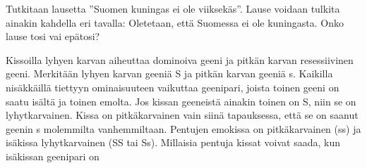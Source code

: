 \begin{kotitehtavasivu}
\begin{tehtava}
\end{tehtava}

\begin{tehtava}
    Tutkitaan lausetta ''Suomen kuningas ei ole viiksekäs''. Lause voidaan tulkita ainakin kahdella eri tavalla:
    Oletetaan, että Suomessa ei ole kuningasta. Onko lause tosi vai epätosi?

    \begin{vastaus}
    \end{vastaus}
    
\end{tehtava}

\begin{tehtava}
    Kissoilla lyhyen karvan aiheuttaa dominoiva geeni ja pitkän karvan resessiivinen geeni. Merkitään lyhyen karvan geeniä S ja pitkän karvan geeniä s. Kaikilla nisäkkäillä tiettyyn ominaisuuteen vaikuttaa geenipari, joista toinen geeni on saatu isältä ja toinen emolta. Jos kissan geeneistä ainakin toinen on S, niin se on lyhytkarvainen. Kissa on pitkäkarvainen vain siinä tapauksessa, että se on saanut geenin s molemmilta vanhemmiltaan.  Pentujen emokissa on pitkäkarvainen (ss) ja isäkissa lyhytkarvainen (SS tai Ss). Millaisia pentuja kissat voivat saada, kun isäkissan geenipari on

    \begin{vastaus}
    \end{vastaus}
\end{tehtava}

\end{kotitehtavasivu}
